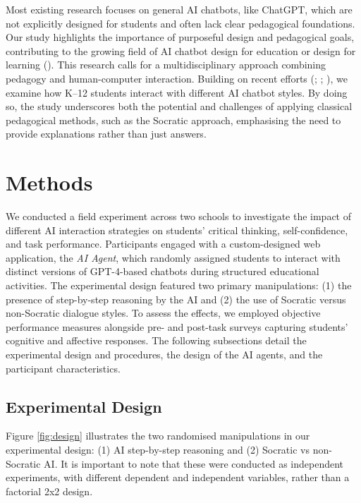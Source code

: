 \documentclass[
  11pt,
]{article}
\begin{document}
Most existing research focuses on general AI chatbots, like ChatGPT, which are not explicitly designed for students and often lack clear pedagogical foundations. Our study highlights the importance of purposeful design and pedagogical goals, contributing to the growing field of AI chatbot design for education or design for learning (). This research calls for a multidisciplinary approach combining pedagogy and human-computer interaction. Building on recent efforts (; ; ), we examine how K--12 students interact with different AI chatbot styles. By doing so, the study underscores both the potential and challenges of applying classical pedagogical methods, such as the Socratic approach, emphasising the need to provide explanations rather than just answers.

\section{Methods}\label{sec:methods}

We conducted a field experiment across two schools to investigate the impact of different AI interaction strategies on students' critical thinking, self-confidence, and task performance. Participants engaged with a custom-designed web application, the \emph{AI Agent}, which randomly assigned students to interact with distinct versions of GPT-4-based chatbots during structured educational activities. The experimental design featured two primary manipulations: (1) the presence of step-by-step reasoning by the AI and (2) the use of Socratic versus non-Socratic dialogue styles. To assess the effects, we employed objective performance measures alongside pre- and post-task surveys capturing students' cognitive and affective responses. The following subsections detail the experimental design and procedures, the design of the AI agents, and the participant characteristics.

\subsection{Experimental Design}\label{experimental-design}

Figure \ref{fig:design} illustrates the two randomised manipulations in our experimental design: (1) AI step-by-step reasoning and (2) Socratic vs non-Socratic AI. It is important to note that these were conducted as independent experiments, with different dependent and independent variables, rather than a factorial 2x2 design.
\end{document}
